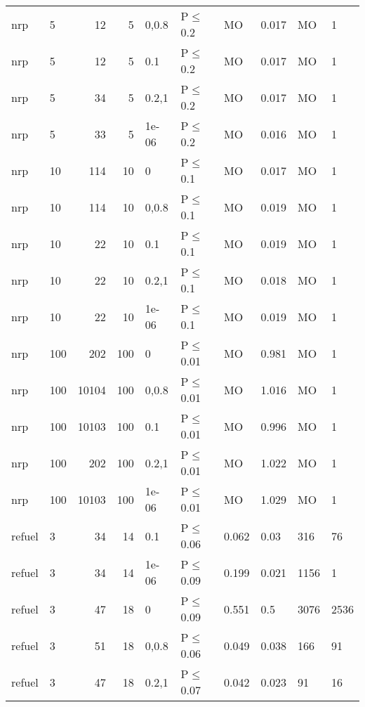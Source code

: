 \begin{longtable}{llrrllllll}
 nrp           & 5         &     	12 &   5 & 0,0.8 & P$\leq$0.2   & MO      & 0.017    & MO     & 1      \\
 nrp           & 5         &     	12 &   5 & 0.1   & P$\leq$0.2   & MO      & 0.017    & MO     & 1      \\
 nrp           & 5         &     	34 &   5 & 0.2,1 & P$\leq$0.2   & MO      & 0.017    & MO     & 1      \\
 nrp           & 5         &     	33 &   5 & 1e-06 & P$\leq$0.2   & MO      & 0.016    & MO     & 1      \\
 nrp           & 10        &    	114 &  10 & 0     & P$\leq$0.1   & MO      & 0.017    & MO     & 1      \\
 nrp           & 10        &    	114 &  10 & 0,0.8 & P$\leq$0.1   & MO      & 0.019    & MO     & 1      \\
 nrp           & 10        &     	22 &  10 & 0.1   & P$\leq$0.1   & MO      & 0.019    & MO     & 1      \\
 nrp           & 10        &     	22 &  10 & 0.2,1 & P$\leq$0.1   & MO      & 0.018    & MO     & 1      \\
 nrp           & 10        &     	22 &  10 & 1e-06 & P$\leq$0.1   & MO      & 0.019    & MO     & 1      \\
 nrp           & 100       &    	202 & 100 & 0     & P$\leq$0.01  & MO      & 0.981    & MO     & 1      \\
 nrp           & 100       &  	10104 & 100 & 0,0.8 & P$\leq$0.01  & MO      & 1.016    & MO     & 1      \\
 nrp           & 100       &  	10103 & 100 & 0.1   & P$\leq$0.01  & MO      & 0.996    & MO     & 1      \\
 nrp           & 100       &    	202 & 100 & 0.2,1 & P$\leq$0.01  & MO      & 1.022    & MO     & 1      \\
 nrp           & 100       &  	10103 & 100 & 1e-06 & P$\leq$0.01  & MO      & 1.029    & MO     & 1      \\
 refuel        & 3         &     	34 &  14 & 0.1   & P$\leq$0.06  & 0.062   & 0.03     & 316    & 76     \\
 refuel        & 3         &     	34 &  14 & 1e-06 & P$\leq$0.09  & 0.199   & 0.021    & 1156   & 1      \\
 refuel        & 3         &     	47 &  18 & 0     & P$\leq$0.09  & 0.551   & 0.5      & 3076   & 2536   \\
 refuel        & 3         &     	51 &  18 & 0,0.8 & P$\leq$0.06  & 0.049   & 0.038    & 166    & 91     \\
 refuel        & 3         &     	47 &  18 & 0.2,1 & P$\leq$0.07  & 0.042   & 0.023    & 91     & 16     \\
\bottomrule
\end{longtable}
